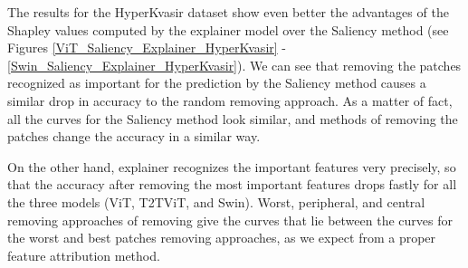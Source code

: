 \documentclass[magisterska,en]{pracamgr}
\begin{document}
The results for the HyperKvasir dataset show even better the advantages of the Shapley values computed by the explainer model over the Saliency method (see Figures \ref{ViT_Saliency_Explainer_HyperKvasir} -\ref{Swin_Saliency_Explainer_HyperKvasir}). We can see that removing the patches recognized as important for the prediction by the Saliency method causes a similar drop in accuracy to the random removing approach. As a matter of fact, all the curves for the Saliency method look similar, and methods of removing the patches change the accuracy in a similar way. 

On the other hand, explainer recognizes the important features very precisely, so that the accuracy after removing the most important features drops fastly for all the three models (ViT, T2T\textunderscore ViT, and Swin). Worst, peripheral, and central removing approaches of removing give the curves that lie between the curves for the worst and best patches removing approaches, as we expect from a proper feature attribution method.
\end{document}
